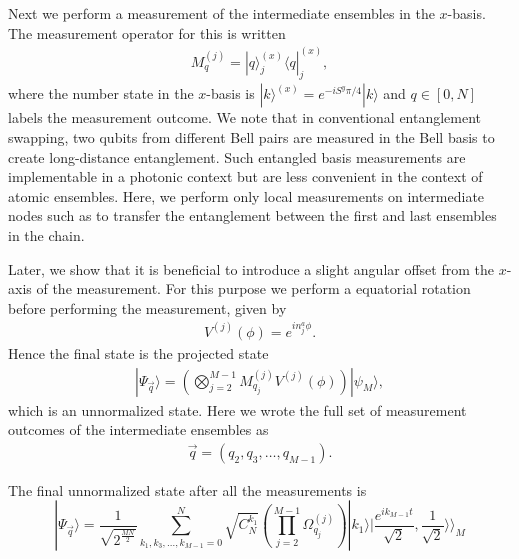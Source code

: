 \documentclass{WileyMSP-template}
\begin{document}


Next we perform a measurement of the intermediate ensembles in the $x$-basis.  The measurement operator for this is written
%
\begin{align}
M_q^{(j)} = | q \rangle^{(x)}_j \langle q |^{(x)}_j ,
\label{measurementop}
\end{align}
%
where the number state in the $ x $-basis is $ | k  \rangle^{(x)} = e^{-iS^y \pi/ 4} | k  \rangle $ and $ q \in [0,N] $ labels the measurement outcome.
We note that in conventional entanglement swapping, two qubits from different Bell pairs are measured in the Bell basis to create long-distance entanglement. Such entangled basis measurements are implementable in a photonic context but are less convenient in the context of atomic ensembles.  Here, we perform only local measurements on intermediate nodes such as to transfer the entanglement between the first and last ensembles in the chain.

Later, we show that it is beneficial to introduce a slight angular offset from the $ x $-axis of the measurement.  For this purpose we perform a equatorial rotation before performing the measurement, given by
%
\begin{align}
V^{(j)}(\phi)  = e^{i n^a_j \phi} .
\label{equatorrot}
\end{align}
%
Hence the final state is the projected state
%
\begin{align}
| \Psi_{\vec{q}} \rangle = \left( \bigotimes_{j=2}^{M-1} M^{(j)}_{q_j} V^{(j)}(\phi) \right) | \psi_M \rangle  ,
\end{align}
%
which is an unnormalized state.  Here we wrote the full set of measurement outcomes of the intermediate ensembles as
%
\begin{align}
\vec{q} = (q_2, q_3, \dots, q_{M-1} ) .
\end{align}
%



The final unnormalized state after all the measurements is
%
\begin{equation}
| \Psi_{\vec{q}} \rangle =\frac{1}{\sqrt{2^{\frac{MN}{2}}}}\sum_{ k_1, k_3, \dots, k_{M-1}  = 0}^{N}  \sqrt{ C^{k_1}_{N}} \left( \prod_{j=2}^{M-1} \Omega_{q_j}^{(j)} \right)
    |k_1\rangle|\frac{e^{i k_{M-1}t}}{\sqrt{2}},\frac{1}{\sqrt{2}}\rangle\rangle_M
\label{final_even}
\end{equation}
%
\end{document}
